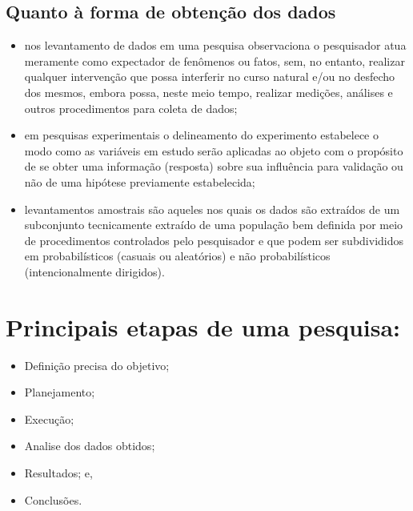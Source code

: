 \documentclass[
]{book}
\providecommand{\tightlist}{%
  \setlength{\itemsep}{0pt}\setlength{\parskip}{0pt}}
\begin{document}
\hfill\break

\hypertarget{quanto-uxe0-forma-de-obtenuxe7uxe3o-dos-dados}{%
\subsection{Quanto à forma de obtenção dos dados}\label{quanto-uxe0-forma-de-obtenuxe7uxe3o-dos-dados}}

\hfill\break

\begin{itemize}
\tightlist
\item
  nos levantamento de dados em uma pesquisa observaciona o pesquisador atua meramente como expectador de fenômenos ou fatos, sem, no entanto, realizar qualquer intervenção que possa interferir no curso natural e/ou no desfecho dos mesmos, embora possa, neste meio tempo, realizar medições, análises e outros procedimentos para coleta de dados;\\
\item
  em pesquisas experimentais o delineamento do experimento estabelece o modo como as variáveis em estudo serão aplicadas ao objeto com o propósito de se obter uma informação (resposta) sobre sua influência para validação ou não de uma hipótese previamente estabelecida;\\
\item
  levantamentos amostrais são aqueles nos quais os dados são extraídos de um subconjunto tecnicamente extraído de uma população bem definida por meio de procedimentos controlados pelo pesquisador e que podem ser subdivididos em probabilísticos (casuais ou aleatórios) e não probabilísticos (intencionalmente dirigidos).
\end{itemize}

\hfill\break

\hypertarget{principais-etapas-de-uma-pesquisa}{%
\section{Principais etapas de uma pesquisa:}\label{principais-etapas-de-uma-pesquisa}}

\hfill\break

\begin{itemize}
\tightlist
\item
  Definição precisa do objetivo;\\
\item
  Planejamento;\\
\item
  Execução;
\item
  Analise dos dados obtidos;\\
\item
  Resultados; e,
\item
  Conclusões.
\end{itemize}
\end{document}
